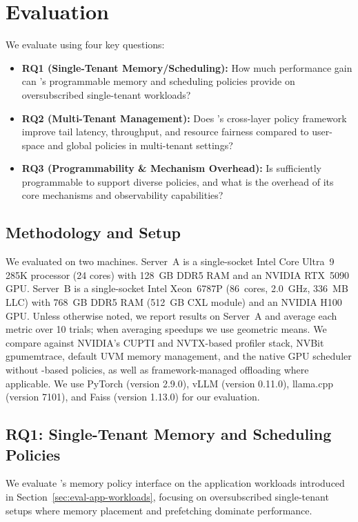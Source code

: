 \section{Evaluation}
\label{sec:eval}

We evaluate \sys using four key questions:

\begin{itemize}[leftmargin=*]
  \item \textbf{RQ1 (Single-Tenant Memory/Scheduling):} How much performance gain can \sys's programmable memory and scheduling policies provide on oversubscribed single-tenant workloads?
  \item \textbf{RQ2 (Multi-Tenant Management):} Does \sys's cross-layer policy framework improve tail latency, throughput, and resource fairness compared to user-space and global policies in multi-tenant settings?
  \item \textbf{RQ3 (Programmability \& Mechanism Overhead):} Is \sys sufficiently programmable to support diverse policies, and what is the overhead of its core mechanisms and observability capabilities?
\end{itemize}

\subsection{Methodology and Setup}

We evaluated \sys on two machines. Server~A is a single-socket Intel Core
Ultra~9 285K processor (24 cores) with 128~GB DDR5 RAM and an NVIDIA RTX~5090
GPU. Server~B is a single-socket Intel Xeon~6787P (86~cores, 2.0~GHz, 336~MB
LLC) with 768~GB DDR5 RAM (512~GB CXL module) and an NVIDIA H100 GPU. Unless
otherwise noted, we report results on Server~A and average each metric over
10 trials; when averaging speedups we use geometric means. We compare against
NVIDIA's CUPTI and NVTX-based profiler stack, NVBit gpumemtrace, default UVM
memory management, and the native GPU scheduler without \sys-based policies, as
well as framework-managed offloading where applicable. We use PyTorch (version 2.9.0), vLLM (version 0.11.0), llama.cpp (version 7101), and Faiss (version 1.13.0) for our evaluation.



\subsection{RQ1: Single-Tenant Memory and Scheduling Policies}

We evaluate \sys's memory policy interface on the application workloads introduced in Section~\ref{sec:eval-app-workloads}, focusing on oversubscribed single-tenant setups where memory placement and prefetching dominate performance.


